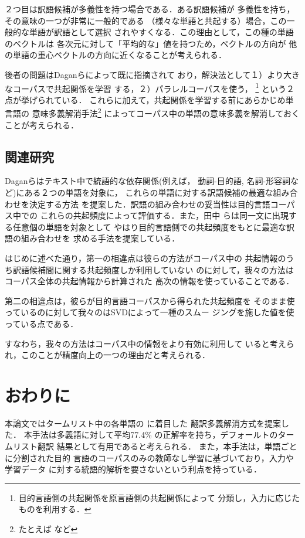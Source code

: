   ２つ目は訳語候補が多義性を持つ場合である．ある訳語候補が
多義性を持ち，その意味の一つが非常に一般的である
（様々な単語と共起する）場合，この一般的な単語が訳語として選択
されやすくなる．この理由として，この種の単語のベクトルは
各次元に対して「平均的な」値を持つため，ベクトルの方向が
他の単語の重心ベクトルの方向に近くなることが考えられる．

  後者の問題はDaganら\cite{Dagan94}によって既に指摘されて
おり，解決法として１）より大きなコーパスで共起関係を学習
する，２）パラレルコーパスを使う，
\footnote{目的言語側の共起関係を原言語側の共起関係によって
分類し，入力に応じたものを利用する．} という２点が挙げられている．
これらに加えて，共起関係を学習する前にあらかじめ単言語の
意味多義解消手法\footnote{たとえば\cite{Schuetze97}\cite{Pereira93}
など} によってコーパス中の単語の意味多義を解消しておくことが考えられる．

\subsection{関連研究}

  Daganら\cite{Dagan94}はテキスト中で統語的な依存関係(例えば，
動詞-目的語, 名詞-形容詞など)にある２つの単語を対象に，
これらの単語に対する訳語候補の最適な組み合わせを決定する方法
を提案した．訳語の組み合わせの妥当性は目的言語コーパス中での
これらの共起頻度によって評価する．また，田中
\cite{Tanaka96}らは同一文に出現する任意個の単語を対象として
やはり目的言語側での共起頻度をもとに最適な訳語の組み合わせを
求める手法を提案している．

  はじめに述べた通り，第一の相違点は彼らの方法がコーパス中の
共起情報のうち訳語候補間に関する共起頻度しか利用していない
のに対して，我々の方法はコーパス全体の共起情報から計算された
高次の情報を使っていることである．

  第二の相違点は，彼らが目的言語コーパスから得られた共起頻度を
そのまま使っているのに対して我々のはSVDによって一種のスムー
ジングを施した値を使っている点である．

  すなわち，我々の方法はコーパス中の情報をより有効に利用して
いると考えられ，このことが精度向上の一つの理由だと考えられる．

\section{おわりに}

  本論文ではタームリスト中の各単語の \ikanren に着目した
翻訳多義解消方式を提案した．
本手法は多義語に対して平均77.4\%
の正解率を持ち，デフォールトのタームリスト翻訳
結果として有用であると考えられる．
また，本手法は，単語ごとに分割された目的
言語のコーパスのみの教師なし学習に基づいており，入力や学習データ 
に対する統語的解析を要さないという利点を持っている．

